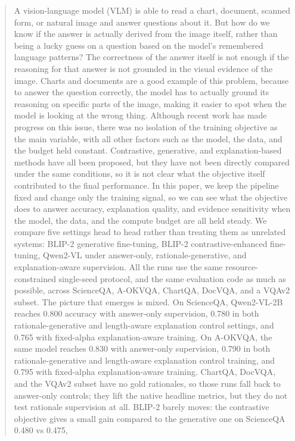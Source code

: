 \documentclass[preprint,12pt]{elsarticle}
\begin{document}
\begin{frontmatter}
\begin{abstract}
A vision-language model (VLM) is able to read a chart, document, scanned form, or natural image and answer questions about it. 
But how do we know if the answer is actually derived from the image itself, rather than being a lucky guess on a question based on the model's remembered language patterns?
The correctness of the answer itself is not enough if the reasoning for that answer is not grounded in the visual evidence of the image.
Charts and documents are a good example of this problem, because to answer the question correctly, the model has to actually ground its reasoning on specific parts of the image,
making it easier to spot when the model is looking at the wrong thing. Although recent work has made progress on this issue,
there was no isolation of the training objective as the main variable, with all other factors such as the model, the data, and the budget held constant.
Contrastive, generative, and explanation-based methods have all been proposed, but they have not been directly compared under the same conditions,
so it is not clear what the objective itself contributed to the final performance. 
In this paper, we keep the pipeline fixed and change only the training signal, so we can see what the objective does to answer accuracy, explanation quality, 
and evidence sensitivity when the model, the data, and the compute budget are all held steady.
We compare five settings head to head rather than treating them as unrelated systems: BLIP-2 generative fine-tuning, BLIP-2 contrastive-enhanced fine-tuning,
Qwen2-VL under answer-only, rationale-generative, and explanation-aware supervision.
All the runs use the same resource-constrained single-seed protocol, and the same evaluation code as much as possible,
across ScienceQA, A-OKVQA, ChartQA, DocVQA, and a VQAv2 subset.
The picture that emerges is mixed. On ScienceQA, Qwen2-VL-2B reaches 0.800 accuracy with answer-only supervision,
0.780 in both rationale-generative and length-aware explanation control settings, and 0.765 with fixed-alpha explanation-aware training.
On A-OKVQA, the same model reaches 0.830 with answer-only supervision, 0.790 in both rationale-generative and length-aware explanation control training,
and 0.795 with fixed-alpha explanation-aware training.
ChartQA, DocVQA, and the VQAv2 subset have no gold rationales, so those runs fall back to answer-only controls;
they lift the native headline metrics, but they do not test rationale supervision at all.
BLIP-2 barely moves: the contrastive objective gives a small gain compared to the generative one on ScienceQA 0.480 vs 0.475,

\end{abstract}
\end{frontmatter}
\end{document}
